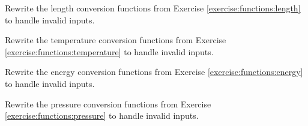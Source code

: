 \begin{exer}
Rewrite the length conversion functions from Exercise \ref{exercise:functions:length}
to handle invalid inputs.
\end{exer}

\begin{exer}
Rewrite the temperature conversion functions from Exercise \ref{exercise:functions:temperature}
to handle invalid inputs.
\end{exer}

\begin{exer}
Rewrite the energy conversion functions from Exercise \ref{exercise:functions:energy}
to handle invalid inputs.
\end{exer}

\begin{exer}
Rewrite the pressure conversion functions from Exercise \ref{exercise:functions:pressure}
to handle invalid inputs.
\end{exer}





